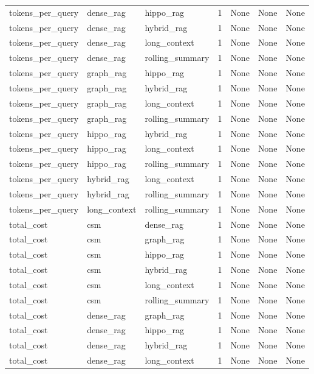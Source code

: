 \begin{tabular}{lllllll}
tokens\_per\_query & dense\_rag & hippo\_rag & 1 & None & None & None \\
tokens\_per\_query & dense\_rag & hybrid\_rag & 1 & None & None & None \\
tokens\_per\_query & dense\_rag & long\_context & 1 & None & None & None \\
tokens\_per\_query & dense\_rag & rolling\_summary & 1 & None & None & None \\
tokens\_per\_query & graph\_rag & hippo\_rag & 1 & None & None & None \\
tokens\_per\_query & graph\_rag & hybrid\_rag & 1 & None & None & None \\
tokens\_per\_query & graph\_rag & long\_context & 1 & None & None & None \\
tokens\_per\_query & graph\_rag & rolling\_summary & 1 & None & None & None \\
tokens\_per\_query & hippo\_rag & hybrid\_rag & 1 & None & None & None \\
tokens\_per\_query & hippo\_rag & long\_context & 1 & None & None & None \\
tokens\_per\_query & hippo\_rag & rolling\_summary & 1 & None & None & None \\
tokens\_per\_query & hybrid\_rag & long\_context & 1 & None & None & None \\
tokens\_per\_query & hybrid\_rag & rolling\_summary & 1 & None & None & None \\
tokens\_per\_query & long\_context & rolling\_summary & 1 & None & None & None \\
total\_cost & csm & dense\_rag & 1 & None & None & None \\
total\_cost & csm & graph\_rag & 1 & None & None & None \\
total\_cost & csm & hippo\_rag & 1 & None & None & None \\
total\_cost & csm & hybrid\_rag & 1 & None & None & None \\
total\_cost & csm & long\_context & 1 & None & None & None \\
total\_cost & csm & rolling\_summary & 1 & None & None & None \\
total\_cost & dense\_rag & graph\_rag & 1 & None & None & None \\
total\_cost & dense\_rag & hippo\_rag & 1 & None & None & None \\
total\_cost & dense\_rag & hybrid\_rag & 1 & None & None & None \\
total\_cost & dense\_rag & long\_context & 1 & None & None & None \\

\end{tabular}
